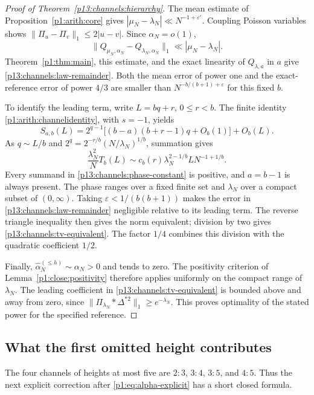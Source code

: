 \begin{proof}[Proof of Theorem~\ref{p13:channels:hierarchy}]
The mean estimate of Proposition~\ref{p1:arith:core} gives
$|\mu_N-\lambda_N|\ll N^{-1+\varepsilon'}$.  Coupling Poisson variables
shows $\|\Pi_u-\Pi_v\|_1\leq2|u-v|$.  Since $\alpha_N=o(1)$,
\[
 \|Q_{\mu_N,\alpha_N}-Q_{\lambda_N,\alpha_N}\|_1
      \ll |\mu_N-\lambda_N|.
\]
Theorem~\ref{p1:thm:main}, this estimate, and the exact linearity of
$Q_{\lambda,a}$ in $a$ give \eqref{p13:channels:law-remainder}.
Both the mean error of power one and the exact-reference error of power
$4/3$ are smaller than $N^{-b/(b+1)+\varepsilon}$ for this fixed $b$.

To identify the leading term, write $L=bq+r$, $0\leq r<b$.
The finite identity \eqref{p1:arith:channelidentity}, with $s=-1$, yields
\[
 S_{a,b}(L)
  =2^{q-1}\bigl[(b-a)(b+r-1)q+O_b(1)\bigr]+O_b(L).
\]
As $q\sim L/b$ and
$2^q=2^{-r/b}(N/\lambda_N)^{1/b}$, summation gives
\begin{equation}
 \frac{\lambda_N^2}{N}T_b(L)
  \sim c_b(r)\lambda_N^{2-1/b}L N^{-1+1/b}.
 \label{p13:channels:omitted-equivalent}
\end{equation}
Every summand in \eqref{p13:channels:phase-constant} is positive, and
$a=b-1$ is always present.  The phase ranges over a fixed finite set
and $\lambda_N$ over a compact subset of $(0,\infty)$.
Taking $\varepsilon<1/(b(b+1))$ makes the error in
\eqref{p13:channels:law-remainder} negligible relative to its leading
term.  The reverse triangle inequality then gives the norm equivalent;
division by two gives \eqref{p13:channels:tv-equivalent}.
The factor $1/4$ combines this division with the quadratic coefficient
$1/2$.

Finally, $\widehat\alpha_N^{(\leq h)}\sim\alpha_N>0$ and tends to
zero.  The positivity criterion of Lemma~\ref{p1:close:positivity}
therefore applies uniformly on the compact range of $\lambda_N$.
The leading coefficient in \eqref{p13:channels:tv-equivalent} is bounded
above and away from zero, since
$\|\Pi_{\lambda_N}*\Delta^{*2}\|_1\geq e^{-\lambda_N}$.
This proves optimality of the stated power for the specified reference.
\end{proof}

\subsection{What the first omitted height contributes}

The four channels of heights at most five are $2:3$, $3:4$, $3:5$,
and $4:5$.  Thus the next explicit correction after
\eqref{p1:eq:alpha-explicit} has a short closed formula.

